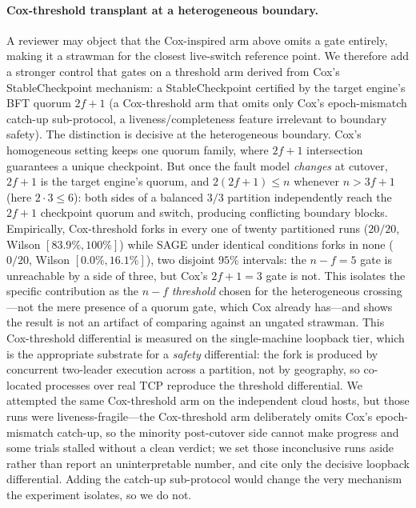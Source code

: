 \documentclass[journal]{IEEEtran}
\theoremstyle{definition}
\theoremstyle{remark}
\begin{document}
\paragraph{Cox-threshold transplant at a heterogeneous boundary.}
A reviewer may object that the Cox-inspired arm above omits a gate entirely, making it a
strawman for the closest live-switch reference point. We therefore add a stronger control that gates on
a threshold arm derived from Cox's StableCheckpoint mechanism: a StableCheckpoint certified by the target engine's BFT
quorum $2f{+}1$ (a Cox-threshold arm that omits only Cox's epoch-mismatch catch-up
sub-protocol, a liveness/completeness feature irrelevant to boundary safety). The distinction is
decisive at the heterogeneous boundary. Cox's homogeneous setting keeps one quorum family, where
$2f{+}1$ intersection guarantees a unique checkpoint. But once the fault model \emph{changes} at
cutover, $2f{+}1$ is the target engine's quorum, and $2(2f{+}1)\le n$ whenever $n>3f{+}1$
(here $2\cdot 3\le 6$): both sides of a balanced $3/3$ partition independently reach the $2f{+}1$
checkpoint quorum and switch, producing conflicting boundary blocks. Empirically, Cox-threshold
forks in every one of twenty partitioned runs ($20/20$, Wilson $[83.9\%,100\%]$) while SAGE under
identical conditions forks in none ($0/20$, Wilson $[0.0\%,16.1\%]$), two disjoint $95\%$ intervals:
the $n{-}f{=}5$ gate is
unreachable by a side of three, but Cox's $2f{+}1{=}3$ gate is not. This isolates the specific
contribution as the $n{-}f$ \emph{threshold} chosen for the heterogeneous crossing---not the mere
presence of a quorum gate, which Cox already has---and shows the result is not an artifact of
comparing against an ungated strawman. This Cox-threshold differential is measured on the
single-machine loopback tier, which is the appropriate substrate for a \emph{safety} differential:
the fork is produced by concurrent two-leader execution across a partition, not by geography, so
co-located processes over real TCP reproduce the threshold differential. We attempted the same Cox-threshold
arm on the independent cloud hosts, but those runs were liveness-fragile---the Cox-threshold arm
deliberately omits Cox's epoch-mismatch catch-up, so the minority post-cutover side cannot make
progress and some trials stalled without a clean verdict; we set those inconclusive runs aside
rather than report an uninterpretable number, and cite only the decisive loopback differential. Adding the catch-up sub-protocol would change the very
mechanism the experiment isolates, so we do not.
\end{document}
